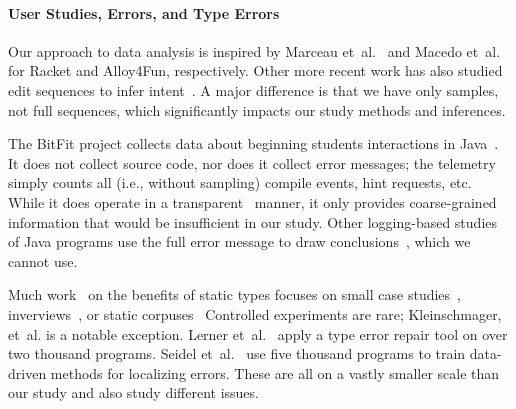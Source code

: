 \documentclass[english,submission,cleveref]{programming}
\begin{document}



\paragraph{User Studies, Errors, and Type Errors}

Our approach to data analysis is inspired by Marceau
et~al.~\cite{mfk-sigcse-2011,mfk-onward-2011} and
Macedo et~al.~\cite{mcpcsprs-abz-2020,mcpcsprs-scp-2021}
for Racket and Alloy4Fun, respectively. Other more recent work has
also studied edit sequences to infer intent~\cite{lgk-pj-2022,rsgl-cpp-2020,wk-koli-2020}.
A major difference is that we have only samples, not full sequences,
which significantly impacts our study methods and inferences.

The BitFit project collects data about beginning students interactions in
Java~\cite{ekc-wccce-2016,anna-russo-kennedy-ms-2006}.
It does not collect source code, nor does it collect error messages;
the telemetry simply counts all (i.e., without sampling) compile events, hint
requests, etc. While it does operate in a
transparent~\cite{transparent-telemetry} manner, it only provides
coarse-grained information that would be insufficient in our study.
Other logging-based studies of Java programs use the full error message to
draw conclusions~\cite{bgimgm-cse-2016,dlc-iticse-2014}, which we
cannot use.

Much work~\cite{heeren-thesis,empirical-types} on the benefits of static types focuses on
small case studies~\cite{hw-scp-2004,td-tosem-2001,w-popl-1986},
inverviews~\cite{cdhhjklwya-hatra-2020,cams-oopsla-2020,gstf-hatra-2021},
or static
corpuses~\cite{bhmvv-toplas-2019,rppd-fse-2014}
Controlled experiments are rare;
Kleinschmager, et~al.\cite{khrts-icpc-2012} is a notable exception.
Lerner et~al.~\cite{lfgc-pldi-2007} apply a type error repair tool on
over two thousand programs.
Seidel et~al.~\cite{sjw-jfp-2018,sscwj-oopsla-2017} use five thousand programs
to train data-driven methods for localizing errors.
These are all on a vastly smaller scale than our study and also study
different issues.

%
%
%
%
%
\end{document}
